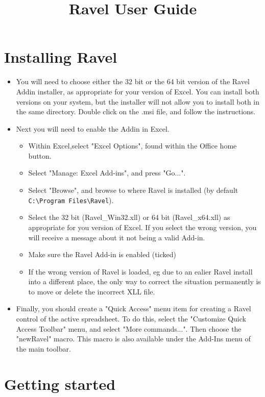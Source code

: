\documentclass{article}
\title{Ravel User Guide}
\begin{document}
\maketitle
\section{Installing Ravel}

\begin{itemize} 

\item You will need to choose either the 32 bit or the 64 bit version
of the Ravel Addin installer, as appropriate for your version of
Excel. You can install both versions on your system, but the installer
will not allow you to install both in the same directory. Double click
on the .msi file, and follow the instructions.

\item Next you will need to enable the Addin in Excel. 
\begin{itemize}
\item Within Excel,select "Excel Options", found within the Office
home button. 
\item Select "Manage: Excel Add-ins", and press "Go...".
\item Select "Browse", and browse to where Ravel is installed (by
default \verb+C:\Program Files\Ravel+).
\item Select the 32 bit (Ravel\_Win32.xll) or 64 bit (Ravel\_x64.xll)
as appropriate for you version of Excel. If you select the wrong
version, you will receive a message about it not being a valid Add-in.
\item Make sure the Ravel Add-in is enabled (ticked)
\item If the wrong version of Ravel is loaded, eg due to an ealier
Ravel install into a different place, the only way to correct
the situation permanently is to move or delete the incorrect XLL file.
\end{itemize}

\item Finally, you should create a "Quick Access" menu item for
creating a Ravel control of the active spreadsheet. To do this, select
the "Customize Quick Access Toolbar" menu, and select "More
commands...". Then choose the "newRavel" macro. This macro is also
available under the Add-Ins menu of the main toolbar.

\end{itemize}

\section{Getting started}
\end{document}
